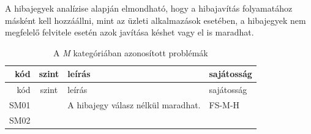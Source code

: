 \documentclass[12pt,magyar,a4paper,oneside]{scrreprt}
\begin{document}
A hibajegyek analízise alapján elmondható, hogy a hibajavítás
folyamatához másként kell hozzáállni, mint az üzleti alkalmazások
esetében, a hibajegyek nem megfelelő felvitele esetén azok javítása
késhet vagy el is maradhat.

\begin{longtable}[]{@{}rcll@{}}
\caption{A \emph{M} kategóriában azonosított problémák}\tabularnewline
\toprule
\begin{minipage}[b]{0.03\columnwidth}\raggedleft
kód\strut
\end{minipage} & \begin{minipage}[b]{0.03\columnwidth}\centering
szint\strut
\end{minipage} & \begin{minipage}[b]{0.69\columnwidth}\raggedright
leírás\strut
\end{minipage} & \begin{minipage}[b]{0.13\columnwidth}\raggedright
sajátosság\strut
\end{minipage}\tabularnewline
\midrule
\endfirsthead
\toprule
\begin{minipage}[b]{0.03\columnwidth}\raggedleft
kód\strut
\end{minipage} & \begin{minipage}[b]{0.03\columnwidth}\centering
szint\strut
\end{minipage} & \begin{minipage}[b]{0.69\columnwidth}\raggedright
leírás\strut
\end{minipage} & \begin{minipage}[b]{0.13\columnwidth}\raggedright
sajátosság\strut
\end{minipage}\tabularnewline
\midrule
\endhead
\begin{minipage}[t]{0.03\columnwidth}\raggedleft
SM01\strut
\end{minipage} & \begin{minipage}[t]{0.03\columnwidth}\centering
2\strut
\end{minipage} & \begin{minipage}[t]{0.69\columnwidth}\raggedright
A hibajegy válasz nélkül maradhat.\strut
\end{minipage} & \begin{minipage}[t]{0.13\columnwidth}\raggedright
FS-M-H\strut
\end{minipage}\tabularnewline
\begin{minipage}[t]{0.03\columnwidth}\raggedleft
SM02\strut
\end{minipage} & \begin{minipage}[t]{0.03\columnwidth}\centering

\end{minipage}
\end{longtable}
\end{document}
